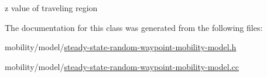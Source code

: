 z value of traveling region 



The documentation for this class was generated from the following files\+:\begin{DoxyCompactItemize}
\item 
mobility/model/\hyperlink{steady-state-random-waypoint-mobility-model_8h}{steady-\/state-\/random-\/waypoint-\/mobility-\/model.\+h}\item 
mobility/model/\hyperlink{steady-state-random-waypoint-mobility-model_8cc}{steady-\/state-\/random-\/waypoint-\/mobility-\/model.\+cc}\end{DoxyCompactItemize}
